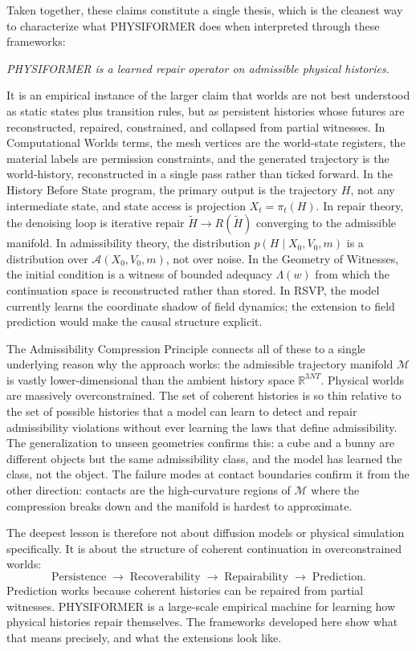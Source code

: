 \documentclass[12pt,oneside]{article}
\theoremstyle{definition}
\newcommand{\A}{\mathcal{A}}
\newcommand{\Mca}{\mathcal{M}}
\begin{document}
Taken together, these claims constitute a single thesis, which is the cleanest
way to characterize what PHYSIFORMER does when interpreted through these frameworks:

\medskip
\noindent\textit{PHYSIFORMER is a learned repair operator on admissible physical histories.}
\medskip

It is an empirical instance of the larger claim that worlds are not best understood
as static states plus transition rules, but as persistent histories whose futures
are reconstructed, repaired, constrained, and collapsed from partial witnesses.
In Computational Worlds terms, the mesh vertices are the world-state registers,
the material labels are permission constraints, and the generated trajectory is
the world-history, reconstructed in a single pass rather than ticked forward.
In the History Before State program, the primary output is the trajectory \(H\),
not any intermediate state, and state access is projection \(X_t = \pi_t(H)\).
In repair theory, the denoising loop is iterative repair \(\tilde{H} \to R(\tilde{H})\)
converging to the admissible manifold. In admissibility theory, the distribution
\(p(H \mid X_0, V_0, m)\) is a distribution over \(\A(X_0, V_0, m)\), not over
noise. In the Geometry of Witnesses, the initial condition is a witness of bounded
adequacy \(\Lambda(w)\) from which the continuation space is reconstructed rather
than stored. In RSVP, the model currently learns the coordinate shadow of field
dynamics; the extension to field prediction would make the causal structure explicit.

The Admissibility Compression Principle connects all of these to a single underlying
reason why the approach works: the admissible trajectory manifold \(\Mca\) is
vastly lower-dimensional than the ambient history space \(\mathbb{R}^{3NT}\).
Physical worlds are massively overconstrained. The set of coherent histories is
so thin relative to the set of possible histories that a model can learn to
detect and repair admissibility violations without ever learning the laws that
define admissibility. The generalization to unseen geometries confirms this:
a cube and a bunny are different objects but the same admissibility class, and
the model has learned the class, not the object. The failure modes at contact
boundaries confirm it from the other direction: contacts are the high-curvature
regions of \(\Mca\) where the compression breaks down and the manifold is hardest
to approximate.

The deepest lesson is therefore not about diffusion models or physical simulation
specifically. It is about the structure of coherent continuation in overconstrained
worlds:
\[
\text{Persistence} \;\to\; \text{Recoverability} \;\to\; \text{Repairability} \;\to\; \text{Prediction.}
\]
Prediction works because coherent histories can be repaired from partial witnesses.
PHYSIFORMER is a large-scale empirical machine for learning how physical histories
repair themselves. The frameworks developed here show what that means precisely,
and what the extensions look like.
\end{document}
